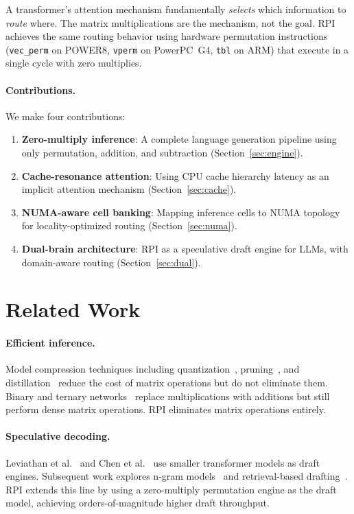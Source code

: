 \documentclass[10pt,twocolumn]{article}
\begin{document}
A transformer's attention mechanism fundamentally \emph{selects} which information to \emph{route} where. The matrix multiplications are the mechanism, not the goal. RPI achieves the same routing behavior using hardware permutation instructions (\texttt{vec\_perm} on POWER8, \texttt{vperm} on PowerPC~G4, \texttt{tbl} on ARM) that execute in a single cycle with zero multiplies.

\paragraph{Contributions.} We make four contributions:

\begin{enumerate}
\item \textbf{Zero-multiply inference}: A complete language generation pipeline using only permutation, addition, and subtraction (Section~\ref{sec:engine}).
\item \textbf{Cache-resonance attention}: Using CPU cache hierarchy latency as an implicit attention mechanism (Section~\ref{sec:cache}).
\item \textbf{NUMA-aware cell banking}: Mapping inference cells to NUMA topology for locality-optimized routing (Section~\ref{sec:numa}).
\item \textbf{Dual-brain architecture}: RPI as a speculative draft engine for LLMs, with domain-aware routing (Section~\ref{sec:dual}).
\end{enumerate}

\section{Related Work}
\label{sec:related}

\paragraph{Efficient inference.} Model compression techniques including quantization~\cite{dettmers2022gptq, frantar2023gptq}, pruning~\cite{frantar2023sparsegpt}, and distillation~\cite{hinton2015distilling} reduce the cost of matrix operations but do not eliminate them. Binary and ternary networks~\cite{courbariaux2016bnn, li2016ternary} replace multiplications with additions but still perform dense matrix operations. RPI eliminates matrix operations entirely.

\paragraph{Speculative decoding.} Leviathan et al.~\cite{leviathan2023speculative} and Chen et al.~\cite{chen2023accelerating} use smaller transformer models as draft engines. Subsequent work explores n-gram models~\cite{yang2023inference} and retrieval-based drafting~\cite{he2023rest}. RPI extends this line by using a zero-multiply permutation engine as the draft model, achieving orders-of-magnitude higher draft throughput.
\end{document}
